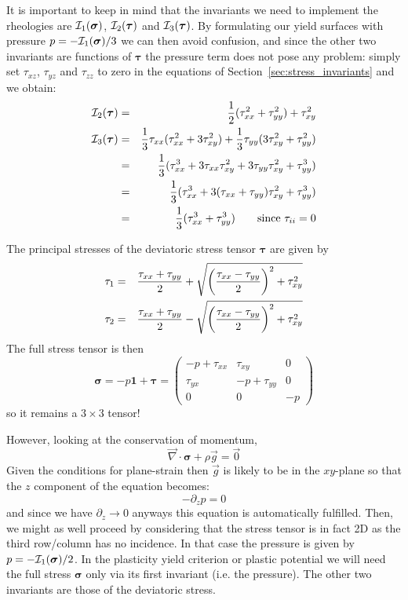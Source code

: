 It is important to keep in mind that the invariants we need to implement 
the rheologies are ${\cal I}_1({\bm \sigma})$,  ${\cal I}_2({\bm \tau})$ and ${\cal I}_3({\bm \tau})$.
By formulating our yield surfaces with pressure $p=-{\cal I}_1({\bm \sigma})/3$ we can then 
avoid confusion, and since the other two invariants are functions of ${\bm \tau}$ the pressure 
term does not pose any problem: simply set $\tau_{xz}$, $\tau_{yz}$ and $\tau_{zz}$ to zero in the 
equations of Section~\ref{sec:stress_invariants} and we obtain:
\begin{eqnarray}
{\cal I}_2({\bm \tau}) &=&\frac{1}{2}(\tau_{xx}^2 + \tau_{yy}^2 ) + \tau_{xy}^2 \\ 
{\cal I}_3({\bm \tau}) 
&=& \frac{1}{3} \tau_{xx} (  \tau_{xx}^2 + 3 \tau_{xy}^2 ) 
+ \frac{1}{3} \tau_{yy} (3 \tau_{xy}^2 +   \tau_{yy}^2 )   \nonumber\\
&=& \frac{1}{3}(  \tau_{xx}^3 + 3 \tau_{xx}\tau_{xy}^2  
+ 3 \tau_{yy} \tau_{xy}^2 +   \tau_{yy}^3 )   \nonumber\\
&=& \frac{1}{3}(  \tau_{xx}^3 + 3 (\tau_{xx}+\tau_{yy}) \tau_{xy}^2  +  \tau_{yy}^3 )   \nonumber\\
&=& \frac{1}{3}(  \tau_{xx}^3 +  \tau_{yy}^3 )  \qquad \text{since } \tau_{ii}=0 
\end{eqnarray}



The principal stresses of the deviatoric stress tensor $\bm\tau$ are given by
\begin{eqnarray}
\tau_1 &=& \frac{ \tau_{xx}+\tau_{yy}}{2} 
+ \sqrt{ \left(\frac{\tau_{xx}-\tau_{yy}}{2}\right)^2 +\tau_{xy}^2 } \nonumber\\
\tau_2 &=& \frac{ \tau_{xx}+\tau_{yy}}{2} 
- \sqrt{ \left(\frac{\tau_{xx}-\tau_{yy}}{2}\right)^2 +\tau_{xy}^2 } \label{eq:princ_stress_2D} 
\end{eqnarray}
The full stress tensor is then
\[
\bm\sigma = -p \bm 1 + \bm\tau
= \left(\begin{array}{ccc}
-p+\tau_{xx} & \tau_{xy} & 0 \\
\tau_{yx} & -p+\tau_{yy} & 0 \\
0 & 0 & -p
\end{array}\right)
\]
so it remains a $3\times 3$ tensor!

However, looking at the conservation of momentum, 
\[
\vec\nabla \cdot \bm\sigma + \rho \vec g = \vec 0
\]
Given the conditions for plane-strain then $\vec g$ is likely to be in 
the $xy$-plane so that the $z$ component of the equation becomes:
\[
-\partial_z p = 0
\]
and since we have $\partial_z \rightarrow 0$ anyways this equation 
is automatically fulfilled. Then, we might as well proceed 
by considering that the stress tensor is in fact 2D as the third row/column
has no incidence. In that case the pressure is given by $p=-{\cal I}_1(\bm\sigma)/2$.
In the plasticity yield criterion or plastic potential we will 
need the full stress ${\bm \sigma}$ only via its first invariant (i.e. the pressure). 
The other two invariants are those of the deviatoric stress. 

